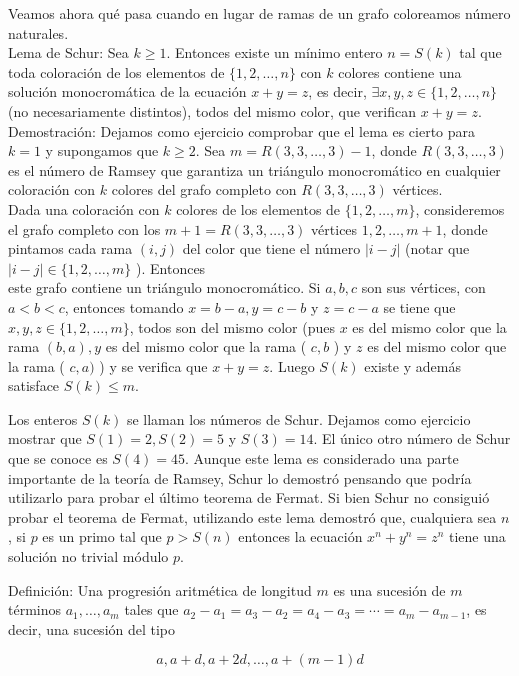 \documentclass[10pt]{article}
\begin{document}
Veamos ahora qué pasa cuando en lugar de ramas de un grafo coloreamos número naturales.\\
Lema de Schur: Sea $k \geq 1$. Entonces existe un mínimo entero $n=S(k)$ tal que toda coloración de los elementos de $\{1,2, \ldots, n\}$ con $k$ colores contiene una solución monocromática de la ecuación $x+y=z$, es decir, $\exists x, y, z \in\{1,2, \ldots, n\}$ (no necesariamente distintos), todos del mismo color, que verifican $x+y=z$.\\
Demostración: Dejamos como ejercicio comprobar que el lema es cierto para $k=1$ y supongamos que $k \geq 2$. Sea $m=R(3,3, \ldots, 3)-1$, donde $R(3,3, \ldots, 3)$ es el número de Ramsey que garantiza un triángulo monocromático en cualquier coloración con $k$ colores del grafo completo con $R(3,3, \ldots, 3)$ vértices.\\
Dada una coloración con $k$ colores de los elementos de $\{1,2, \ldots, m\}$, consideremos el grafo completo con los $m+1=R(3,3, \ldots, 3)$ vértices $1,2, \ldots, m+1$, donde pintamos cada rama $(i, j)$ del color que tiene el número $|i-j|$ (notar que $|i-j| \in\{1,2, \ldots, m\}$ ). Entonces\\
este grafo contiene un triángulo monocromático. Si $a, b, c$ son sus vértices, con $a<b<c$, entonces tomando $x=b-a, y=c-b$ y $z=c-a$ se tiene que $x, y, z \in\{1,2, \ldots, m\}$, todos son del mismo color (pues $x$ es del mismo color que la rama $(b, a), y$ es del mismo color que la rama ( $c, b$ ) y $z$ es del mismo color que la rama ( $c, a)$ ) y se verifica que $x+y=z$. Luego $S(k)$ existe y además satisface $S(k) \leq m$.

Los enteros $S(k)$ se llaman los números de Schur. Dejamos como ejercicio mostrar que $S(1)=2, S(2)=5$ y $S(3)=14$. El único otro número de Schur que se conoce es $S(4)=45$. Aunque este lema es considerado una parte importante de la teoría de Ramsey, Schur lo demostró pensando que podría utilizarlo para probar el último teorema de Fermat. Si bien Schur no consiguió probar el teorema de Fermat, utilizando este lema demostró que, cualquiera sea $n$, si $p$ es un primo tal que $p>S(n)$ entonces la ecuación $x^{n}+y^{n}=z^{n}$ tiene una solución no trivial módulo $p$.

Definición: Una progresión aritmética de longitud $m$ es una sucesión de $m$ términos $a_{1}, \ldots, a_{m}$ tales que $a_{2}-a_{1}=a_{3}-a_{2}=a_{4}-a_{3}=\cdots=a_{m}-a_{m-1}$, es decir, una sucesión del tipo

$$
a, a+d, a+2 d, \ldots, a+(m-1) d
$$
\end{document}
